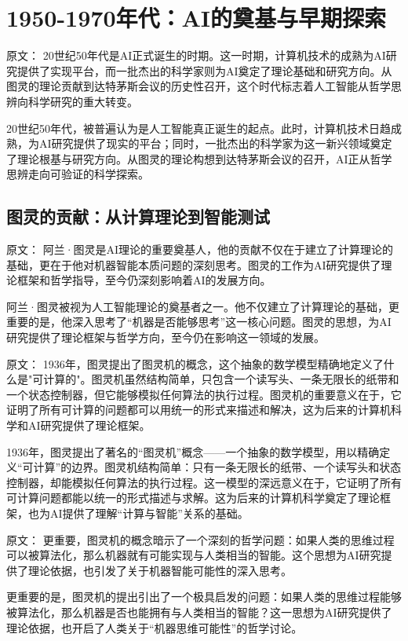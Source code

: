 \section{1950-1970年代：AI的奠基与早期探索}

原文：
20世纪50年代是AI正式诞生的时期。这一时期，计算机技术的成熟为AI研究提供了实现平台，而一批杰出的科学家则为AI奠定了理论基础和研究方向。从图灵的理论贡献到达特茅斯会议的历史性召开，这个时代标志着人工智能从哲学思辨向科学研究的重大转变。

20世纪50年代，被普遍认为是人工智能真正诞生的起点。此时，计算机技术日趋成熟，为AI研究提供了现实的平台；同时，一批杰出的科学家为这一新兴领域奠定了理论根基与研究方向。从图灵的理论构想到达特茅斯会议的召开，AI正从哲学思辨走向可验证的科学探索。

\subsection{图灵的贡献：从计算理论到智能测试}

原文：
阿兰·图灵是AI理论的重要奠基人，他的贡献不仅在于建立了计算理论的基础，更在于他对机器智能本质问题的深刻思考。图灵的工作为AI研究提供了理论框架和哲学指导，至今仍深刻影响着AI的发展方向。

阿兰·图灵被视为人工智能理论的奠基者之一。他不仅建立了计算理论的基础，更重要的是，他深入思考了“机器是否能够思考”这一核心问题。图灵的思想，为AI研究提供了理论框架与哲学方向，至今仍在影响这一领域的发展。

原文：
1936年，图灵提出了图灵机的概念，这个抽象的数学模型精确地定义了什么是"可计算的"。图灵机虽然结构简单，只包含一个读写头、一条无限长的纸带和一个状态控制器，但它能够模拟任何算法的执行过程。图灵机的重要意义在于，它证明了所有可计算的问题都可以用统一的形式来描述和解决，这为后来的计算机科学和AI研究提供了理论框架。

1936年，图灵提出了著名的“图灵机”概念——一个抽象的数学模型，用以精确定义“可计算”的边界。图灵机结构简单：只有一条无限长的纸带、一个读写头和状态控制器，却能模拟任何算法的执行过程。这一模型的深远意义在于，它证明了所有可计算问题都能以统一的形式描述与求解。这为后来的计算机科学奠定了理论框架，也为AI提供了理解“计算与智能”关系的基础。

原文：
更重要，图灵机的概念暗示了一个深刻的哲学问题：如果人类的思维过程可以被算法化，那么机器就有可能实现与人类相当的智能。这个思想为AI研究提供了理论依据，也引发了关于机器智能可能性的深入思考。

更重要的是，图灵机的提出引出了一个极具启发的问题：如果人类的思维过程能够被算法化，那么机器是否也能拥有与人类相当的智能？这一思想为AI研究提供了理论依据，也开启了人类关于“机器思维可能性”的哲学讨论。

